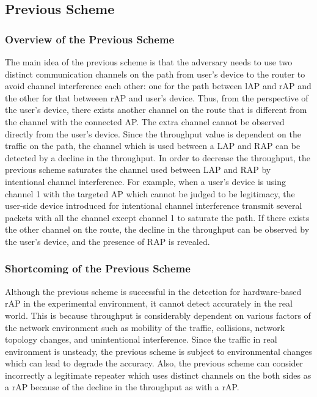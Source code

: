 \documentclass[conference]{IEEEtran}
\begin{document}
\subsection{Previous Scheme}
\subsubsection{Overview of the Previous Scheme}
The main idea of the previous scheme \cite{previous} is that the adversary needs to use two distinct communication channels on the path from user's device to the router to avoid channel interference each other: one for the path between lAP and rAP and the other for that betweeen rAP and user's device.
Thus, from the perspective of the user's device, there exists another channel on the route that is different from the channel with the connected AP.
The extra channel cannot be observed directly from the user's device.
Since the throughput value is dependent on the traffic on the path, the channel which is used between a LAP and RAP can be detected by a decline in the throughput.
In order to decrease the throughput, the previous scheme saturates the channel used between LAP and RAP by intentional channel interference.
For example, when a user's device is using channel 1 with the targeted AP which cannot be judged to be legitimacy, the user-side device introduced for intentional channel interference transmit several packets with all the channel except channel 1 to saturate the path.
If there exists the other channel on the route, the decline in the throughput can be observed by the user's device, and the presence of RAP is revealed.

\subsubsection{Shortcoming of the Previous Scheme}
Although the previous scheme is successful in the detection for hardware-based rAP in the experimental environment, it cannot detect accurately in the real world.
This is because throughput is considerably dependent on various factors of the network environment such as mobility of the traffic, collisions, network topology changes, and unintentional interference.
Since the traffic in real environment is unsteady, the previous scheme is subject to environmental changes which can lead to degrade the accuracy.
Also, the previous scheme can consider incorrectly a legitimate repeater which uses distinct channels on the both sides as a rAP because of the decline in the throughput as with a rAP.
\end{document}
